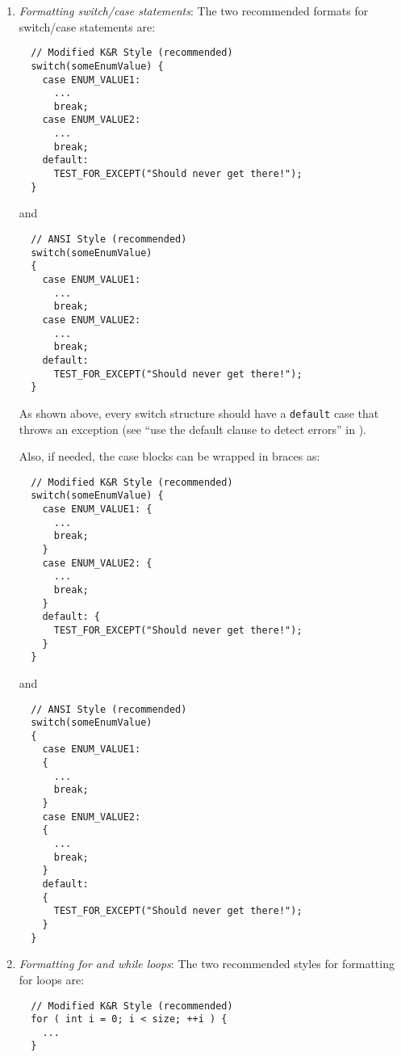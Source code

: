 \begin{enumerate}
\begin{enumerate}
  {}\item\textit{Formatting switch/case statements}: The two recommended
  formats for switch/case statements are:

  {\small\begin{verbatim}
  // Modified K&R Style (recommended)
  switch(someEnumValue) {
    case ENUM_VALUE1:
      ...
      break;
    case ENUM_VALUE2:
      ...
      break;
    default:
      TEST_FOR_EXCEPT("Should never get there!");
  }
  \end{verbatim}}

  {}\noindent{}and

  {\small\begin{verbatim}
  // ANSI Style (recommended)
  switch(someEnumValue)
  {
    case ENUM_VALUE1:
      ...
      break;
    case ENUM_VALUE2:
      ...
      break;
    default:
      TEST_FOR_EXCEPT("Should never get there!");
  }
  \end{verbatim}}

  As shown above, every switch structure should have a {}\texttt{default} case
  that throws an exception (see ``use the default clause to detect errors''
  in {}\cite[Section 15.1]{CodeComplete2nd04}).

  Also, if needed, the case blocks can be wrapped in braces as:

  {\small\begin{verbatim}
  // Modified K&R Style (recommended)
  switch(someEnumValue) {
    case ENUM_VALUE1: {
      ...
      break;
    }
    case ENUM_VALUE2: {
      ...
      break;
    }    
    default: {
      TEST_FOR_EXCEPT("Should never get there!");
    }
  }
  \end{verbatim}}

  {}\noindent{}and

  {\small\begin{verbatim}
  // ANSI Style (recommended)
  switch(someEnumValue)
  {
    case ENUM_VALUE1:
    {
      ...
      break;
    }
    case ENUM_VALUE2:
    {
      ...
      break;
    }    
    default:
    {
      TEST_FOR_EXCEPT("Should never get there!");
    }
  }
  \end{verbatim}}

  {}\item\textit{Formatting for and while loops}: The two recommended styles
  for formatting for loops are:

  {\small\begin{verbatim}
  // Modified K&R Style (recommended)
  for ( int i = 0; i < size; ++i ) {
    ...
  }
  \end{verbatim}}


\end{enumerate}
\end{enumerate}
